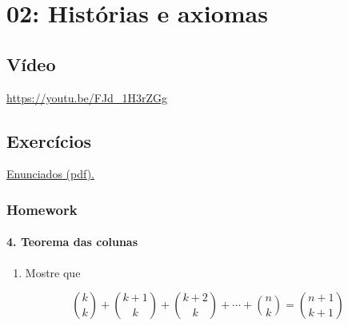\documentclass[
  11pt]{report}
\providecommand{\tightlist}{%
  \setlength{\itemsep}{0pt}\setlength{\parskip}{0pt}}
\begin{document}
\hypertarget{histuxf3rias-e-axiomas}{%
\chapter*{02: Histórias e axiomas}\label{histuxf3rias-e-axiomas}}

\hypertarget{vuxeddeo-1}{%
\section*{Vídeo}\label{vuxeddeo-1}}

\begin{center} \url{https://youtu.be/FJd_1H3rZGg} \end{center}

\hypertarget{exercuxedcios-1}{%
\section*{Exercícios}\label{exercuxedcios-1}}

\href{https://projects.iq.harvard.edu/files/stat110/files/strategic_practice_and_homework_1.pdf}{Enunciados (pdf).}

\hypertarget{homework}{%
\subsection*{Homework}\label{homework}}

\hypertarget{teorema-das-colunas}{%
\subsubsection*{4. Teorema das colunas}\label{teorema-das-colunas}}

\begin{rmdbox}

\begin{enumerate}
\def\labelenumi{(\alph{enumi})}
\tightlist
\item
  Mostre que
\end{enumerate}

\[
\binom{k}{k} + \binom{k + 1}{k} + \binom{k + 2}{k} + \cdots + 
\binom{n}{k} = \binom{n + 1}{k + 1}
\]

\end{rmdbox}
\end{document}
